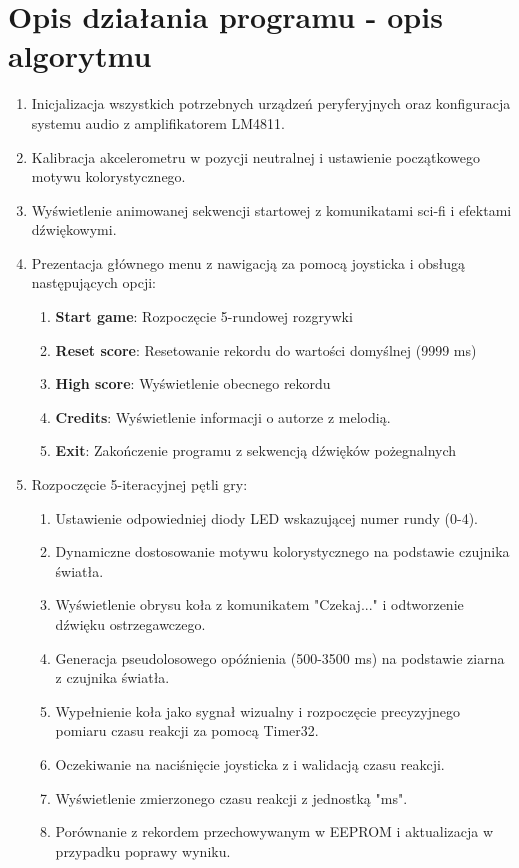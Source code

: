 \documentclass[a4paper,12pt]{report}
\begin{document}
\chapter{Opis działania programu - opis algorytmu}
\begin{enumerate}
\item Inicjalizacja wszystkich potrzebnych urządzeń peryferyjnych oraz konfiguracja systemu audio z amplifikatorem LM4811.
\item Kalibracja akcelerometru w pozycji neutralnej i ustawienie początkowego motywu kolorystycznego.
\item Wyświetlenie animowanej sekwencji startowej z komunikatami sci-fi i efektami dźwiękowymi.
\item Prezentacja głównego menu z nawigacją za pomocą joysticka i obsługą następujących opcji:
\begin{enumerate}
\item \textbf{Start game}: Rozpoczęcie 5-rundowej rozgrywki
\item \textbf{Reset score}: Resetowanie rekordu do wartości domyślnej (9999 ms)
\item \textbf{High score}: Wyświetlenie obecnego rekordu
\item \textbf{Credits}: Wyświetlenie informacji o autorze z melodią.
\item \textbf{Exit}: Zakończenie programu z sekwencją dźwięków pożegnalnych
\end{enumerate}
\item Rozpoczęcie 5-iteracyjnej pętli gry:
\begin{enumerate}
\item Ustawienie odpowiedniej diody LED wskazującej numer rundy (0-4).
\item Dynamiczne dostosowanie motywu kolorystycznego na podstawie czujnika światła.
\item Wyświetlenie obrysu koła z komunikatem "Czekaj..." i odtworzenie dźwięku ostrzegawczego.
\item Generacja pseudolosowego opóźnienia (500-3500 ms) na podstawie ziarna z czujnika światła.
\item Wypełnienie koła jako sygnał wizualny i rozpoczęcie precyzyjnego pomiaru czasu reakcji za pomocą Timer32.
\item Oczekiwanie na naciśnięcie joysticka z i walidacją czasu reakcji.
\item Wyświetlenie zmierzonego czasu reakcji z jednostką "ms".
\item Porównanie z rekordem przechowywanym w EEPROM i aktualizacja w przypadku poprawy wyniku.

\end{enumerate}
\end{enumerate}
\end{document}
